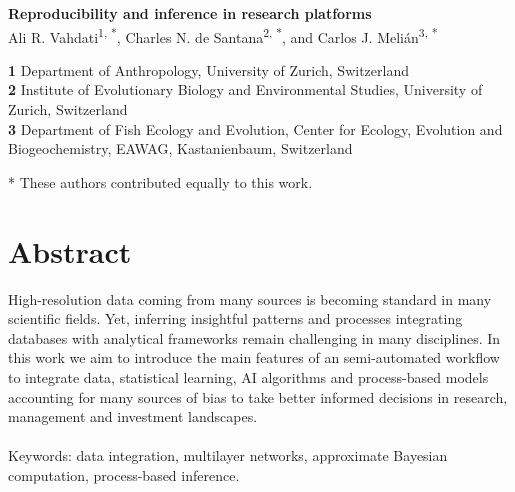 \documentclass[english,12pt]{article}
\date{}
\begin{document}
\begin{flushleft}
  \textbf{\Large Reproducibility and inference in research platforms}\\
  \vspace{0.5cm} Ali R. Vahdati\textsuperscript{1, *}, \vspace{0.5cm}
  Charles N. de Santana\textsuperscript{2, *}, and Carlos
  J. Meli\'an\textsuperscript{3, *}

\textbf{1} Department of Anthropology, University of Zurich, Switzerland\\
\textbf{2} Institute of Evolutionary Biology and Environmental Studies, University of Zurich, Switzerland\\
\textbf{3} Department of Fish Ecology and Evolution, Center for Ecology, Evolution and Biogeochemistry, EAWAG, Kastanienbaum, Switzerland
\\
\bigskip
\end{flushleft}
* These authors contributed equally to this work.\\
\newpage


\tableofcontents
\newpage

\section{Abstract}
High-resolution data coming from many sources is becoming standard in
many scientific fields. Yet, inferring insightful patterns and
processes integrating databases with analytical frameworks remain
challenging in many disciplines. In this work we aim to introduce the
main features of an semi-automated workflow to integrate data,
statistical learning, AI algorithms and process-based models
accounting for many sources of bias to take better informed decisions
in research, management and investment landscapes.
\\
\\
Keywords: data integration, multilayer networks, approximate
Bayesian computation, process-based inference.
\newpage
\end{document}
